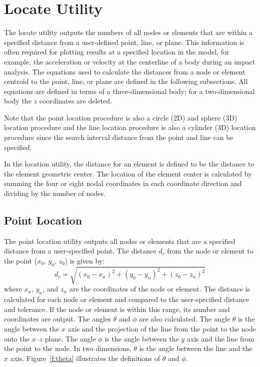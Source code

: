 \section{Locate Utility}\label{sec:locate}

The locate utility outputs the numbers of all nodes or elements that are
within a specified distance from a user-defined point, line, or plane.
This information is often required for plotting results at a specified
location in the model, for example, the acceleration or velocity at the
centerline of a body during an impact analysis.  The equations used to
calculate the distances from a node or element centroid to the point,
line, or plane are defined in the following subsections.  All equations
are defined in terms of a three-dimensional body; for a two-dimensional
body the $z$ coordinates are deleted. 

Note that the point location procedure is also a circle (2D) and sphere
(3D) location procedure and the line location procedure is also a
cylinder (3D) location procedure since the search interval distance from
the point and line can be specified. 
  
In the location utility, the distance for an element is defined to be
the distance to the element geometric center. The location of the
element center is calculated by summing the four or eight nodal
coordinates in each coordinate direction and dividing by the number of
nodes. 

\subsection{Point Location}\label{sec:plocate}
The point location utility outputs all nodes or elements that are a
specified distance from a user-specified point.  The distance $d_r$ from
the node or element to the point ($x_0$, $y_0$, $z_0$) is given by: 
\begin{equation}
d_r = \sqrt{ (x_0-x_n)^2 + (y_0-y_n)^2 + (z_0-z_n)^2}
\end{equation}
where $x_n$, $y_n$, and $z_n$ are the coordinates of the node or
element.  The distance is calculated for each node or element and
compared to the user-specified distance and tolerance.  If the node or
element is within this range, its number and coordinates are output. The
angles $\theta$ and $\phi$ are also calculated.  The angle $\theta$ is
the angle between the $x$ axis and the projection of the line from the
point to the node onto the $x$--$z$ plane.  The angle $\phi$ is the
angle between the $y$ axis and the line from the point to the node.  In
two dimensions, $\theta$ is the angle between the line and the $x$ axis. 
Figure~\ref{f:theta} illustrates the definitions of $\theta$ and $\phi$.

